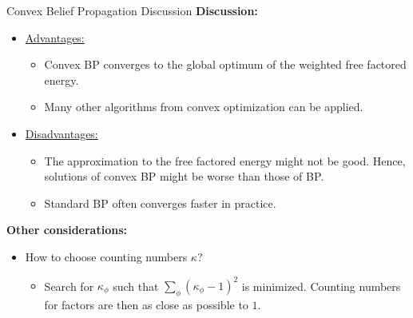 \begin{frame}{Convex Belief Propagation Discussion}
    \textbf{Discussion:}
    \begin{itemize}
        \item \underline{Advantages:}
        \begin{itemize}
            \pause \item Convex BP converges to the global optimum of the weighted free factored energy.
            \pause \item Many other algorithms from convex optimization can be applied.
        \end{itemize}
        \pause \item \underline{Disadvantages:}
        \begin{itemize}
            \pause \item The approximation to the free factored energy might not be good. Hence, solutions of convex BP might be worse than those of BP.
            \pause \item Standard BP often converges faster in practice.
        \end{itemize}
    \end{itemize}
    \textbf{Other considerations:}
\begin{itemize}
    \item How to choose counting numbers $\kappa$?
    \begin{itemize}
        \pause \item Search for $\kappa_{\phi}$ such that $\sum_{\phi} (\kappa_\phi - 1)^2$ is minimized. Counting numbers for factors are then as close as possible to $1$.
    \end{itemize}
\end{itemize}
\end{frame}


